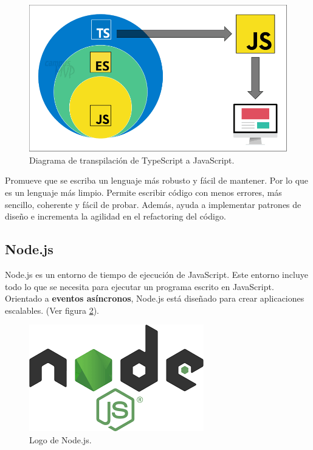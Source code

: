 \documentclass[12pt,twoside,titlepage]{report}
\begin{document}
\begin{figure}[H]
    \centering
    \includegraphics[scale=0.35]{TypeScript/TypeScriptTranspile}
    \caption{Diagrama de transpilación de TypeScript a JavaScript.}
    \label{fig:TypeScript}
\end{figure}

Promueve que se escriba un lenguaje más robusto y fácil de mantener. Por lo que es un lenguaje más limpio. Permite escribir código con menos errores, más sencillo, coherente y fácil de probar. Además, ayuda a implementar patrones de diseño e incrementa la agilidad en el refactoring del código.

\subsection{Node.js}

Node.js es un entorno de tiempo de ejecución de JavaScript. Este entorno incluye todo lo que se necesita para ejecutar un programa escrito en JavaScript. Orientado a \textbf{eventos asíncronos}, Node.js está diseñado para crear aplicaciones escalables.
(Ver figura \ref{fig:NodejsLogo}).

\begin{figure}[H]
    \centering
    \includegraphics[scale=0.4]{Nodejs/Nodejs}
    \caption{Logo de Node.js.}
    \label{fig:NodejsLogo}
\end{figure}
\end{document}
